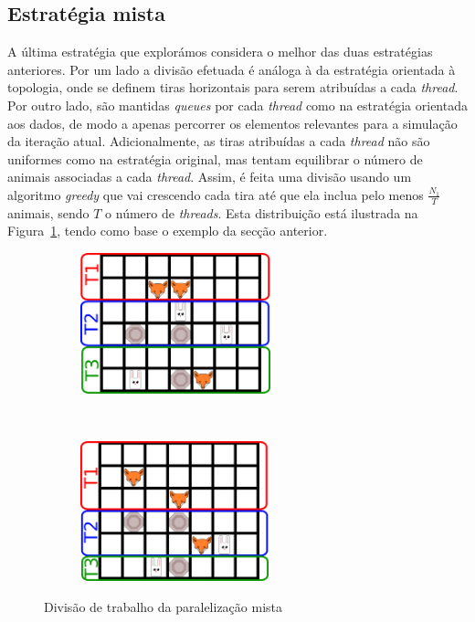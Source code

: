 \documentclass[10pt,a4paper,oneside]{article}
\begin{document}
\subsection{Estratégia mista}
A última estratégia que explorámos considera o melhor das duas
estratégias anteriores. Por um lado a divisão efetuada é análoga à da
estratégia orientada à topologia, onde se definem tiras horizontais
para serem atribuídas a cada \textit{thread}. Por outro lado, são
mantidas \textit{queues} por cada \textit{thread} como na estratégia
orientada aos dados, de modo a apenas percorrer os elementos relevantes
para a simulação da iteração atual. Adicionalmente, as tiras
atribuídas a cada \textit{thread} não são uniformes como na estratégia
original, mas tentam equilibrar o número de animais associadas a cada
\textit{thread}. Assim, é feita uma divisão usando um algoritmo
\textit{greedy} que vai crescendo cada tira até que ela inclua pelo
menos $\frac{N_1}{T}$ animais, sendo $T$ o número de
\textit{threads}. Esta distribuição está ilustrada
na Figura~\ref{fig:par3}, tendo como base o exemplo da secção
anterior.

\begin{figure}[H]
    \centering
    \begin{subfigure}[b]{0.4\textwidth}
      \centering
      \includegraphics[height=1.6in]{grid1_par3.png}
    \end{subfigure}
    ~
    \begin{subfigure}[b]{0.4\textwidth}
      \centering
      \includegraphics[height=1.6in]{grid2_par3.png}
    \end{subfigure}
    \caption{Divisão de trabalho da paralelização mista}
    \label{fig:par3}
\end{figure}
\end{document}
